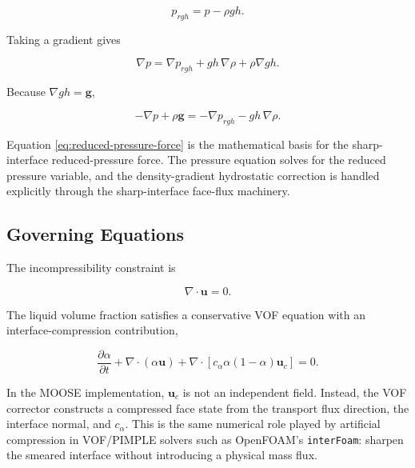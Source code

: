 \documentclass[11pt]{article}
\newcommand{\grad}{\nabla}
\newcommand{\divergence}{\nabla\!\cdot}
\begin{document}
\begin{equation}
  p_{rgh}=p-\rho gh.
  \label{eq:prgh}
\end{equation}

Taking a gradient gives

\begin{equation}
  \grad p
  =
  \grad p_{rgh}
  +
  gh\,\grad\rho
  +
  \rho\grad gh.
\end{equation}

Because \(\grad gh=\mathbf{g}\),

\begin{equation}
  -\grad p+\rho\mathbf{g}
  =
  -\grad p_{rgh}-gh\,\grad\rho.
  \label{eq:reduced-pressure-force}
\end{equation}

Equation \eqref{eq:reduced-pressure-force} is the mathematical basis for the
sharp-interface reduced-pressure force.  The pressure equation solves for the
reduced pressure variable, and the density-gradient hydrostatic correction is
handled explicitly through the sharp-interface face-flux machinery.

\subsection{Governing Equations}

The incompressibility constraint is

\begin{equation}
  \divergence\mathbf{u}=0.
  \label{eq:div-free}
\end{equation}

The liquid volume fraction satisfies a conservative VOF equation with an
interface-compression contribution,

\begin{equation}
  \frac{\partial\alpha}{\partial t}
  +
  \divergence(\alpha\mathbf{u})
  +
  \divergence\!\left[
    c_\alpha\alpha(1-\alpha)\mathbf{u}_c
  \right]
  =
  0.
  \label{eq:continuous-alpha}
\end{equation}

In the MOOSE implementation, \(\mathbf{u}_c\) is not an independent field.
Instead, the VOF corrector constructs a compressed face state from the transport
flux direction, the interface normal, and \(c_\alpha\).  This is the same
numerical role played by artificial compression in VOF/PIMPLE solvers such as
OpenFOAM's \texttt{interFoam}: sharpen the smeared interface without introducing
a physical mass flux.
\end{document}
